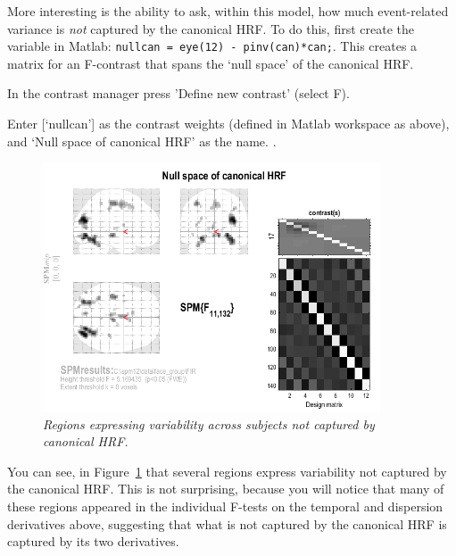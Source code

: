 More interesting is the ability to ask, within this model, how much event-related variance is {\em not} captured by the canonical HRF. To do this, first create the variable in Matlab: \verb!nullcan = eye(12) - pinv(can)*can;!.
This creates a matrix for an F-contrast that spans the `null space' of the canonical HRF.
\bi
\item{In the contrast manager press 'Define new contrast' (select F).}
\item{Enter [`nullcan'] as the contrast weights (defined in Matlab workspace as above), and `Null space of canonical HRF' as the name.}
\ei
\cite{daniel_hbf2}.
\begin{figure}
\begin{center}
\includegraphics[width=100mm]{faces_group/nullcan}
\caption{\em Regions expressing variability across subjects not captured by canonical HRF. \label{nullcan}}
\end{center}
\end{figure}
You can see, in Figure~\ref{nullcan} that several regions express variability not captured by the canonical HRF. This is not surprising, because you will notice that many of these regions appeared in the individual F-tests on the temporal and dispersion derivatives above, suggesting that what is not captured by the canonical HRF is captured by its two derivatives.

